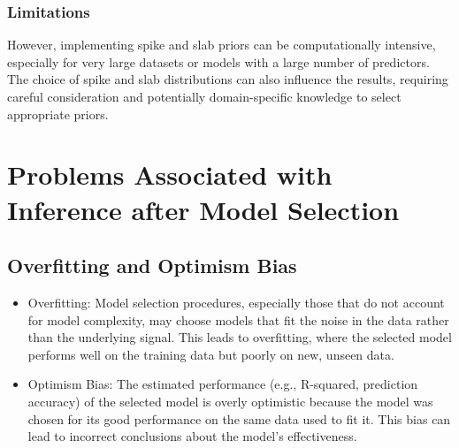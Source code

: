 \documentclass{article}
\begin{document}
\subsubsection{Limitations}

However, implementing spike and slab priors can be computationally intensive, especially for very large datasets or models with a large number of predictors. The choice of spike and slab distributions can also influence the results, requiring careful consideration and potentially domain-specific knowledge to select appropriate priors.


\section{Problems Associated with Inference after Model Selection}

\subsection{Overfitting and Optimism Bias}
\begin{itemize}
    \item Overfitting: Model selection procedures, especially those that do not account for model complexity, may choose models that fit the noise in the data rather than the underlying signal. This leads to overfitting, where the selected model performs well on the training data but poorly on new, unseen data.
    \item Optimism Bias: The estimated performance (e.g., R-squared, prediction accuracy) of the selected model is overly optimistic because the model was chosen for its good performance on the same data used to fit it. This bias can lead to incorrect conclusions about the model's effectiveness.
\end{itemize}
\end{document}
